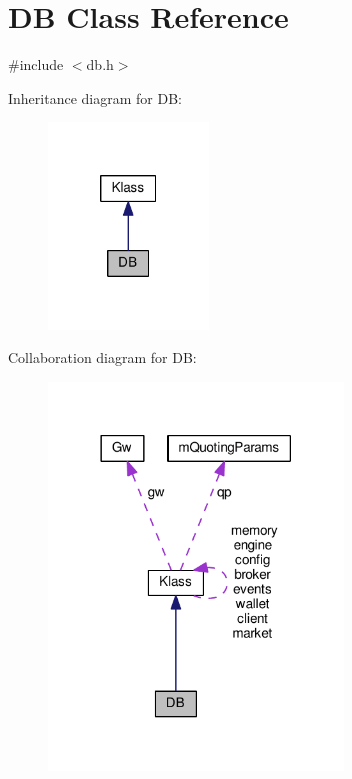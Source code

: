\hypertarget{class_k_1_1_d_b}{}\section{DB Class Reference}
\label{class_k_1_1_d_b}


{\ttfamily \#include $<$db.\+h$>$}



Inheritance diagram for DB\+:
\nopagebreak
\begin{figure}[H]
\begin{center}
\leavevmode
\includegraphics[width=121pt]{class_k_1_1_d_b__inherit__graph}
\end{center}
\end{figure}


Collaboration diagram for DB\+:
\nopagebreak
\begin{figure}[H]
\begin{center}
\leavevmode
\includegraphics[width=222pt]{class_k_1_1_d_b__coll__graph}
\end{center}
\end{figure}
